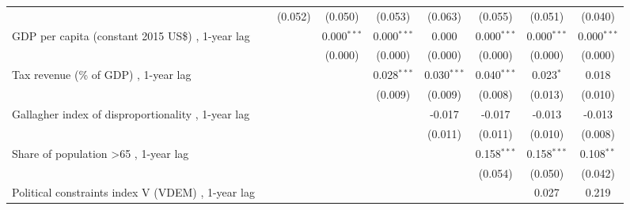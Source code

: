 \begin{table}[htbp]
\begin{tabular}{lcccccccc}
                                                                                                        &                & (0.052)       & (0.050)       & (0.053)       & (0.063)       & (0.055)       & (0.051)       & (0.040)\\   
      GDP per capita (constant 2015 US\$) , 1-year lag                                                  &                &               & 0.000$^{***}$ & 0.000$^{***}$ & 0.000         & 0.000$^{***}$ & 0.000$^{***}$ & 0.000$^{***}$\\   
                                                                                                        &                &               & (0.000)       & (0.000)       & (0.000)       & (0.000)       & (0.000)       & (0.000)\\   
      Tax revenue (\% of GDP) , 1-year lag                                                              &                &               &               & 0.028$^{***}$ & 0.030$^{***}$ & 0.040$^{***}$ & 0.023$^{*}$   & 0.018\\   
                                                                                                        &                &               &               & (0.009)       & (0.009)       & (0.008)       & (0.013)       & (0.010)\\   
      Gallagher index of disproportionality , 1-year lag                                                &                &               &               &               & -0.017        & -0.017        & -0.013        & -0.013\\   
                                                                                                        &                &               &               &               & (0.011)       & (0.011)       & (0.010)       & (0.008)\\   
      Share of population >65 , 1-year lag                                                              &                &               &               &               &               & 0.158$^{***}$ & 0.158$^{***}$ & 0.108$^{**}$\\   
                                                                                                        &                &               &               &               &               & (0.054)       & (0.050)       & (0.042)\\   
      Political constraints index V (VDEM) , 1-year lag                                                 &                &               &               &               &               &               & 0.027         & 0.219\\   

\end{tabular}
\end{table}
